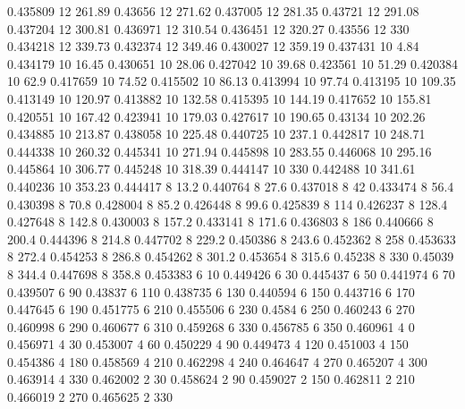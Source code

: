 0.435809 12 261.89
0.43656 12 271.62
0.437005 12 281.35
0.43721 12 291.08
0.437204 12 300.81
0.436971 12 310.54
0.436451 12 320.27
0.43556 12 330
0.434218 12 339.73
0.432374 12 349.46
0.430027 12 359.19
0.437431 10 4.84
0.434179 10 16.45
0.430651 10 28.06
0.427042 10 39.68
0.423561 10 51.29
0.420384 10 62.9
0.417659 10 74.52
0.415502 10 86.13
0.413994 10 97.74
0.413195 10 109.35
0.413149 10 120.97
0.413882 10 132.58
0.415395 10 144.19
0.417652 10 155.81
0.420551 10 167.42
0.423941 10 179.03
0.427617 10 190.65
0.43134 10 202.26
0.434885 10 213.87
0.438058 10 225.48
0.440725 10 237.1
0.442817 10 248.71
0.444338 10 260.32
0.445341 10 271.94
0.445898 10 283.55
0.446068 10 295.16
0.445864 10 306.77
0.445248 10 318.39
0.444147 10 330
0.442488 10 341.61
0.440236 10 353.23
0.444417 8 13.2
0.440764 8 27.6
0.437018 8 42
0.433474 8 56.4
0.430398 8 70.8
0.428004 8 85.2
0.426448 8 99.6
0.425839 8 114
0.426237 8 128.4
0.427648 8 142.8
0.430003 8 157.2
0.433141 8 171.6
0.436803 8 186
0.440666 8 200.4
0.444396 8 214.8
0.447702 8 229.2
0.450386 8 243.6
0.452362 8 258
0.453633 8 272.4
0.454253 8 286.8
0.454262 8 301.2
0.453654 8 315.6
0.45238 8 330
0.45039 8 344.4
0.447698 8 358.8
0.453383 6 10
0.449426 6 30
0.445437 6 50
0.441974 6 70
0.439507 6 90
0.43837 6 110
0.438735 6 130
0.440594 6 150
0.443716 6 170
0.447645 6 190
0.451775 6 210
0.455506 6 230
0.4584 6 250
0.460243 6 270
0.460998 6 290
0.460677 6 310
0.459268 6 330
0.456785 6 350
0.460961 4 0
0.456971 4 30
0.453007 4 60
0.450229 4 90
0.449473 4 120
0.451003 4 150
0.454386 4 180
0.458569 4 210
0.462298 4 240
0.464647 4 270
0.465207 4 300
0.463914 4 330
0.462002 2 30
0.458624 2 90
0.459027 2 150
0.462811 2 210
0.466019 2 270
0.465625 2 330
